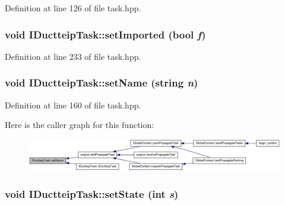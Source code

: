 Definition at line 126 of file task.hpp.\hypertarget{class_i_ductteip_task_a886387bf17236ca511f9e772fd33a961}{
\subsubsection[{setImported}]{\setlength{\rightskip}{0pt plus 5cm}void IDuctteipTask::setImported (bool {\em f})}}
\label{class_i_ductteip_task_a886387bf17236ca511f9e772fd33a961}


Definition at line 233 of file task.hpp.\hypertarget{class_i_ductteip_task_a29e56abf2e5991acc91462c1bbdb1511}{
\subsubsection[{setName}]{\setlength{\rightskip}{0pt plus 5cm}void IDuctteipTask::setName (string {\em n})}}
\label{class_i_ductteip_task_a29e56abf2e5991acc91462c1bbdb1511}


Definition at line 160 of file task.hpp.

Here is the caller graph for this function:\nopagebreak
\begin{figure}[H]
\begin{center}
\leavevmode
\includegraphics[width=420pt]{class_i_ductteip_task_a29e56abf2e5991acc91462c1bbdb1511_icgraph}
\end{center}
\end{figure}
\hypertarget{class_i_ductteip_task_a1bf76470ba95aee4ed77d059144be07f}{
\subsubsection[{setState}]{\setlength{\rightskip}{0pt plus 5cm}void IDuctteipTask::setState (int {\em s})}}
\label{class_i_ductteip_task_a1bf76470ba95aee4ed77d059144be07f}


